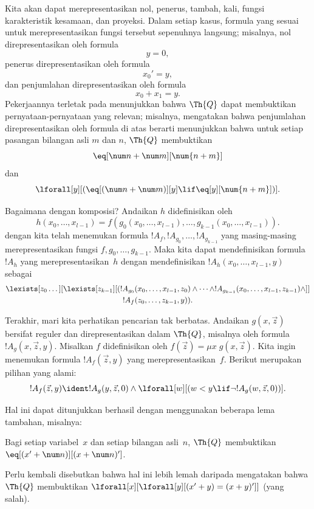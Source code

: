 \documentclass[../../../include/open-logic-section]{subfiles}
\begin{document}
Kita akan dapat merepresentasikan nol, penerus, tambah, kali, fungsi
karakteristik kesamaan, dan proyeksi. Dalam setiap kasus, formula yang sesuai
untuk merepresentasikan fungsi tersebut sepenuhnya langsung; misalnya, nol
direpresentasikan oleh formula
\[
y = 0,
\]
penerus direpresentasikan oleh formula
\[
x_0' = y,
\]
dan penjumlahan direpresentasikan oleh formula
\[
x_0 + x_1 = y.
\]
Pekerjaannya terletak pada menunjukkan bahwa $\Th{Q}$ dapat membuktikan
pernyataan-pernyataan yang relevan; misalnya, mengatakan bahwa penjumlahan
direpresentasikan oleh formula di atas berarti menunjukkan bahwa untuk setiap
pasangan bilangan asli $m$ dan $n$, $\Th{Q}$ membuktikan
\[
\eq[\num n + \num m][\num {n+m}]
\]
dan
\[
\lforall[y][(\eq[(\num n + \num m)][y] \lif \eq[y][\num {n+m}])].
\]

Bagaimana dengan komposisi? Andaikan $h$ didefinisikan oleh
\[
h(x_0,\dots,x_{l-1}) = f(g_0(x_0,\dots,x_{l-1}), \dots,
g_{k-1}(x_0,\dots,x_{l-1})).
\]
dengan kita telah menemukan formula $!A_f, !A_{g_0}, \dots,
!A_{g_{k-1}}$ yang masing-masing merepresentasikan fungsi
$f,g_0,\dots,g_{k-1}$. Maka kita dapat mendefinisikan formula~$!A_h$ yang
merepresentasikan~$h$ dengan mendefinisikan
$!A_h(x_0,\dots,x_{l-1},y)$ sebagai
\begin{multline*}
  \lexists[z_0\dots][\lexists[z_{k-1}][(!A_{g_0}(x_0,\dots,x_{l-1},z_0) \land
  \dots \land !A_{g_{k-1}}(x_0,\dots,x_{l-1},z_{k-1}) \land]]\\
  !A_f(z_0,\dots,z_{k-1},y)).
\end{multline*}

Terakhir, mari kita perhatikan pencarian tak berbatas. Andaikan
$g(x,\vec z)$ bersifat reguler dan direpresentasikan dalam $\Th{Q}$,
misalnya oleh formula $!A_g(x,\vec z,y)$. Misalkan $f$ didefinisikan oleh
$f(\vec z) = \mu x \; g(x,\vec z)$. Kita ingin menemukan formula
$!A_f(\vec z,y)$ yang merepresentasikan~$f$. Berikut merupakan pilihan yang
alami:
\[
!A_f(\vec z,y) \ident !A_g(y,\vec z,0) \land \lforall[w][(w < y
\lif \lnot !A_g(w,\vec z,0))].
\]

Hal ini dapat ditunjukkan berhasil dengan menggunakan beberapa lema tambahan,
misalnya:

\begin{lem}
  Bagi setiap variabel~$x$ dan setiap bilangan asli~$n$, $\Th{Q}$ membuktikan
  $\eq[(x' + \num n)][(x + \num n)']$.
\end{lem}

Perlu kembali disebutkan bahwa hal ini lebih lemah daripada mengatakan bahwa
$\Th{Q}$ membuktikan
$\lforall[x][\lforall[y][(x' + y) = (x +y)']]$ (yang salah).
\end{document}
